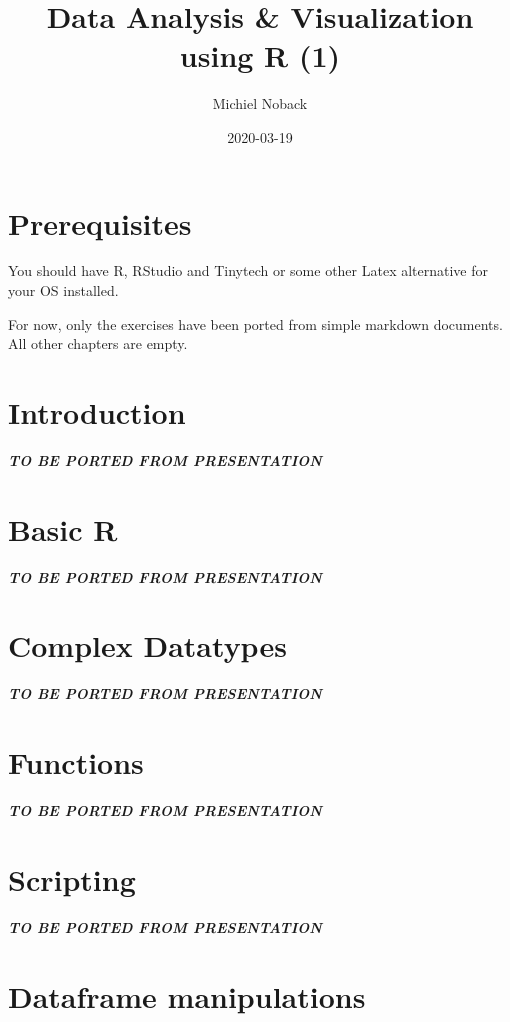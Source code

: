 \documentclass[]{book}
\title{Data Analysis \& Visualization using R (1)}
\author{Michiel Noback}
\date{2020-03-19}
\begin{document}
\maketitle

{
\setcounter{tocdepth}{1}
\tableofcontents
}
\hypertarget{prerequisites}{%
\chapter{Prerequisites}\label{prerequisites}}

You should have R, RStudio and Tinytech or some other Latex alternative for your OS installed.

For now, only the exercises have been ported from simple markdown documents. All other chapters are empty.

\hypertarget{intro}{%
\chapter{Introduction}\label{intro}}

\textbf{\emph{TO BE PORTED FROM PRESENTATION}}

\hypertarget{basic-r}{%
\chapter{Basic R}\label{basic-r}}

\textbf{\emph{TO BE PORTED FROM PRESENTATION}}

\hypertarget{complex-datatypes}{%
\chapter{Complex Datatypes}\label{complex-datatypes}}

\textbf{\emph{TO BE PORTED FROM PRESENTATION}}

\hypertarget{functions}{%
\chapter{Functions}\label{functions}}

\textbf{\emph{TO BE PORTED FROM PRESENTATION}}

\hypertarget{scripting}{%
\chapter{Scripting}\label{scripting}}

\textbf{\emph{TO BE PORTED FROM PRESENTATION}}

\hypertarget{dataframe-manipulations}{%
\chapter{Dataframe manipulations}\label{dataframe-manipulations}}
\end{document}
